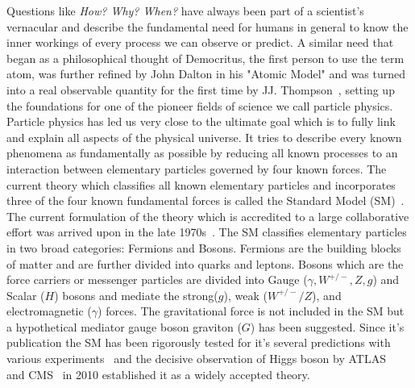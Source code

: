 Questions like \textit{How? Why? When?} have always been part of a scientist's vernacular and describe the fundamental need for humans in general to know the inner workings of every process we can observe or predict. A similar need that began as a philosophical thought of Democritus, the first person to use the term atom, was further refined by John Dalton in his "Atomic Model" and was turned into a real observable quantity for the first time by JJ. Thompson~\cite{SMITH1997}, setting up the foundations for one of the pioneer fields of science we call particle physics. Particle physics has led us very close to the ultimate goal which is to fully link and explain all aspects of the physical universe. It tries to describe every known phenomena as fundamentally as possible by reducing all known processes to an interaction between elementary particles governed by four known forces. The current theory which classifies all known elementary particles and incorporates three of the four known fundamental forces is called the Standard Model (SM)~\cite{Book_SM}. The current formulation of the theory which is accredited to a large collaborative effort was arrived upon in the late 1970s~\cite{GLASHOW1961579,PhysRevLett.19.1264,10025429448}. The SM classifies elementary particles in two broad categories: Fermions and Bosons. Fermions are the building blocks of matter and are further divided into quarks and leptons. Bosons which are the force carriers or messenger particles are divided into Gauge ($\gamma, W^{+/-} ,Z ,g$) and Scalar ($H$) bosons and mediate the strong($g$), weak ($W^{+/-}/Z$), and electromagnetic ($\gamma$) forces. The gravitational force is not included in the SM but a hypothetical mediator gauge boson graviton ($G$) has been suggested. Since it's publication the SM has been rigorously tested for it's several predictions with various experiments~\cite{RevModPhys.71.S96} and the decisive observation of Higgs boson by ATLAS~\cite{Aad_2012} and CMS~\cite{Chatrchyan_2012} in 2010 established it as a widely accepted theory.

